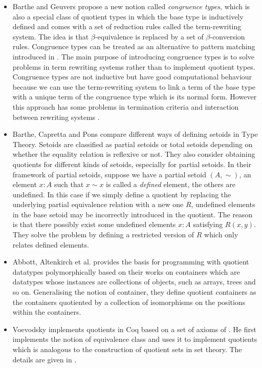 \begin{itemize}
\item Barthe and Geuvers \cite{bar:96} propose a new notion called
  \emph{congruence types}, which is also a special class of quotient
  types in which the base type is inductively defined and comes with a
  set of reduction rules called the term-rewriting system. The idea is
  that $\beta$-equivalence is replaced by a set of $\beta$-conversion
  rules. Congruence types can be treated as an alternative to pattern
  matching introduced in \cite{coq:92}. The main purpose of
  introducing congruence types is to solve problems in term rewriting
  systems rather than to implement quotient types.  Congruence types
  are not inductive but have good computational behaviour because we
  can use the term-rewriting system to link a term of the base type
  with a unique term of the congruence type which is its normal form.
  However this approach has some problems in termination criteria and
  interaction between rewriting systems \cite{cou:01}.

\item Barthe, Capretta and Pons \cite{bar:03} compare different ways
  of defining setoids in Type Theory.  Setoids are classified as
  partial setoids or total setoids depending on whether the equality
  relation is reflexive or not. They also consider obtaining quotients
  for different kinds of setoids, especially for partial setoids.  In
  their framework of partial setoids, suppose we have a partial setoid
  $(A,\sim)$, an element $x : A$ such that $x \sim x$ is called a
  \emph{defined} element, the others are undefined. In this case if we
  simply define a quotient by replacing the underlying partial
  equivalence relation with a new one $R$, undefined elements in the
  base setoid may be incorrectly introduced in the quotient. The
  reason is that there possibly exist some undefined elements $x : A$
  satisfying $R(x,y)$. They solve the problem by defining a restricted
  version of $R$ which only relates defined elements.


\item Abbott, Altenkirch et al. \cite{abb:04} provides the basis for
  programming with quotient datatypes polymorphically based on their
  works on containers which are datatypes whose instances are
  collections of objects, such as arrays, trees and so
  on. Generalising the notion of container, they define quotient
  containers as the containers quotiented by a collection of
  isomorphisms on the positions within the containers.

\item Voevodsky \cite{voe:hset} implements quotients in Coq based on a
  set of axioms of \hott. He first implements the notion of
  equivalence class and uses it to implement quotients which is
  analogous to the construction of quotient sets in set theory. The
  details are given in .
\end{itemize}





